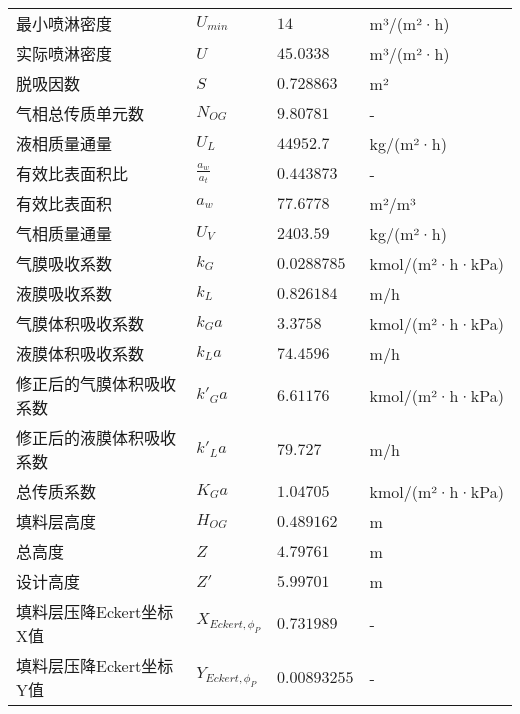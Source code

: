 \begin{longtable}{
		@{} p{} p{} 
		p{} p{} @{}
		}
	最小喷淋密度 & $U_{min}$ & $14$ & m³/(m²·h) \\
	实际喷淋密度 & $U$ & $45.0338$ & m³/(m²·h) \\
	脱吸因数 & $S$ & $0.728863$ & m² \\
	气相总传质单元数 & $N_{OG}$ & $9.80781$ & - \\
	液相质量通量 & $U_L$ & $44952.7$ & kg/(m²·h) \\
	有效比表面积比 & $\frac{a_w}{a_t}$ & $0.443873$ & - \\
	有效比表面积 & $a_w$ & $77.6778$ & m²/m³ \\
	气相质量通量 & $U_V$ & $2403.59$ & kg/(m²·h) \\
	气膜吸收系数 & $k_G$ & $0.0288785$ & kmol/(m²·h·kPa) \\
	液膜吸收系数 & $k_L$ & $0.826184$ & m/h \\
	气膜体积吸收系数 & $k_{G}a$ & $3.3758$ & kmol/(m²·h·kPa) \\
	液膜体积吸收系数 & $k_{L}a$ & $74.4596$ & m/h \\
	修正后的气膜体积吸收系数 & $k'_{G}a$ & $6.61176$ & kmol/(m²·h·kPa) \\
	修正后的液膜体积吸收系数 & $k'_{L}a$ & $79.727$ & m/h \\
	总传质系数 & $K_{G}a$ & $1.04705$ & kmol/(m²·h·kPa) \\
	填料层高度 & $H_{OG}$ & $0.489162$ & m \\
	总高度 & $Z$ & $4.79761$ & m \\
	设计高度 & $Z'$ & $5.99701$ & m \\
	填料层压降Eckert坐标X值 & $X_{Eckert, \phi_P}$ & $0.731989$ & - \\
	填料层压降Eckert坐标Y值 & $Y_{Eckert, \phi_P}$ & $0.00893255$ & - 
\end{longtable}